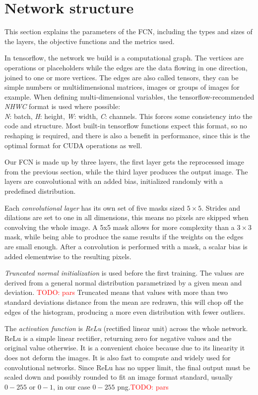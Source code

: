 \documentclass[12pt]{report}
\newcommand\todo[1]{\textcolor{red}{#1}}
\begin{document}
\section{Network structure}
This section explains the parameters of the FCN, including the types and sizes of the layers, the objective functions and the metrics used.

In tensorflow, the network we build is a computational graph. The vertices are operations or placeholders while the edges are the data flowing in one direction, joined to one or more vertices. The edges are also called tensors, they can be simple numbers or multidimensional matrices, images or groups of images for example.
When defining multi-dimensional variables, the tensorflow-recommended \textit{NHWC} format is used where possible:\\
 \textit{N}: batch, \textit{H}: height, \textit{W}: width, \textit{C}: channels. This forces some consistency into the code and structure. Most built-in tensorflow functions expect this format, so no reshaping is required, and there is also a benefit in performance, since this is the optimal format for CUDA operations as well.
 
Our FCN is made up by three layers, the first layer gets the reprocessed image from the previous section, while the third layer produces the output image. The layers are convolutional with an added bias, initialized randomly with a predefined distribution.

Each \textit{convolutional layer} has its own set of five masks sized $5×5$. Strides and dilations are set to one in all dimensions, this means no pixels are skipped when convolving the whole image. A 5x5 mask allows for more complexity than a $3×3$ mask, while being able to produce the same results if the weights on the edges are small enough. After a convolution is performed with a mask, a scalar bias is added elementwise to the resulting pixels.

\textit{Truncated normal initialization} \cite{trunc} is used before the first training. The values are derived from a general normal distribution parametrized by a given mean and deviation. \todo{TODO: pars} Truncated means that values with more than two standard deviations distance from the mean are redrawn, this will chop off the edges of the histogram, producing a more even distribution with fewer outliers.

The \textit{activation function} is \textit{ReLu} (rectified linear unit) \cite{relu} across the whole network. ReLu is a simple linear rectifier, returning zero for negative values and the original value otherwise. It is a convenient choice because due to its linearity it does not deform the images. It is also fast to compute and widely used for convolutional networks. Since ReLu has no upper limit, the final output must be scaled down and possibly rounded to fit an image format standard, usually $0-255$ or $0-1$, in our case $0-255$ png.\todo{TODO: pars}
\end{document}
